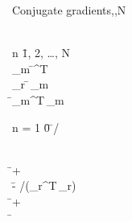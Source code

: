  \begin{algorithm}{Conjugate gradients}{,,N}
   \\
   \\
  \begin{FOR}{n \= 1, 2, \ldots, N} \\
    _m \= ^T\, \\
    _r \= \,_m \\
    \rho \= _m^T\,_m \\
    \begin{IF}{n = 1} 
      \beta \= 0 
      \ELSE 
      \beta \= \rho/\hat{\rho} 
    \end{IF} \\
     \= 
     + \beta\,
     \\
    \alpha \= - \rho/(_r^T\,_r) \\
     \= 
     + \alpha\,
     \\
    \hat{\rho} \= \rho
  \end{FOR} \\        
  \RETURN {}
\end{algorithm}
